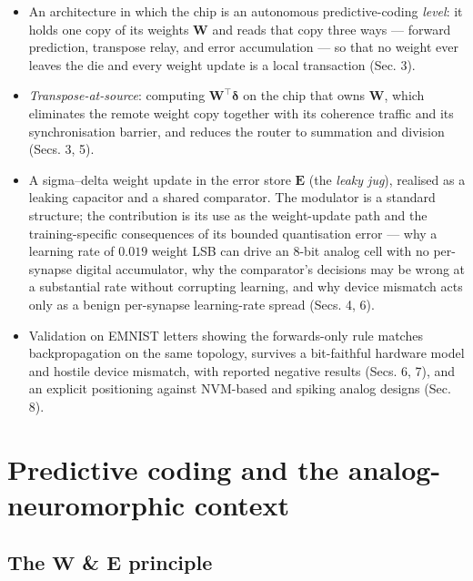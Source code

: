 \documentclass[11pt]{article}
\begin{document}
\begin{itemize}
\item
  An architecture in which the chip is an autonomous predictive-coding
  \emph{level}: it holds one copy of its weights \(\bm W\) and reads
  that copy three ways --- forward prediction, transpose relay, and
  error accumulation --- so that no weight ever leaves the die and every
  weight update is a local transaction (Sec. 3).
\item
  \emph{Transpose-at-source}: computing \(\bm W^{\!\top}\bm\delta\) on
  the chip that owns \(\bm W\), which eliminates the remote weight copy
  together with its coherence traffic and its synchronisation barrier,
  and reduces the router to summation and division (Secs. 3, 5).
\item
  A sigma--delta weight update in the error store \(\bm E\) (the
  \emph{leaky jug}), realised as a leaking capacitor and a shared
  comparator. The modulator is a standard structure; the contribution is
  its use as the weight-update path and the training-specific
  consequences of its bounded quantisation error --- why a learning rate
  of \(0.019\) weight LSB can drive an 8-bit analog cell with no
  per-synapse digital accumulator, why the comparator's decisions may be
  wrong at a substantial rate without corrupting learning, and why
  device mismatch acts only as a benign per-synapse learning-rate spread
  (Secs. 4, 6).
\item
  Validation on EMNIST letters showing the forwards-only rule matches
  backpropagation on the same topology, survives a bit-faithful hardware
  model and hostile device mismatch, with reported negative results
  (Secs. 6, 7), and an explicit positioning against NVM-based and
  spiking analog designs (Sec. 8).
\end{itemize}

\hypertarget{sec:pc}{%
\section{Predictive coding and the analog-neuromorphic
context}\label{sec:pc}}

\hypertarget{the-bm-w-bm-e-principle}{%
\subsection{\texorpdfstring{The \(\bm W\) \& \(\bm E\)
principle}{The \textbackslash bm W \& \textbackslash bm E principle}}\label{the-bm-w-bm-e-principle}}
\end{document}
